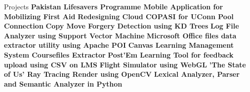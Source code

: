 \begin{rubric}{Projects}
\entry*\textbf{Pakistan Lifesavers Programme Mobile Application for Mobilizing First Aid}
\entry*\textbf{Redesigning Cloud COPASI for UConn Pool Connection}
\entry*\textbf{Copy Move Forgery Detection using KD Trees }
\entry*\textbf{Log File Analyzer using Support Vector Machine}
\entry*\textbf{Microsoft Office files data extractor utility using Apache POI}
\entry*\textbf{Canvas Learning Management System Coursefiles Extractor}
\entry*\textbf{Post'Em Learning Tool for feedback upload using CSV on LMS}
\entry*\textbf{Flight Simulator using WebGL}
\entry*\textbf{'The State of Us' Ray Tracing Render using OpenCV}
\entry*\textbf{Lexical Analyzer, Parser and Semantic Analyzer in Python}
\end{rubric}